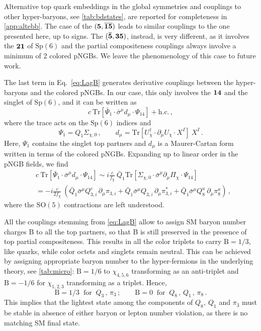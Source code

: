\documentclass[preprintnumbers,nofootinbib,showpacs,eqsecnum,pre,12pt]{revtex4-1}
\newcommand{\SO}{\text{SO}}
\newcommand{\Sp}{\text{Sp}}
\newcommand{\Tr}{\text{Tr}}
\begin{document}
Alternative top quark embeddings in the global symmetries and couplings to other hyper-baryons, see \cref{tab:bdstates}, are reported for completeness in \cref{app:altebb}. The case of the $({\bf 5}, {\bf \overline{15}})$ leads to similar couplings to the one presented here, up to signs. The $({\bf \bar 5}, {\bf 35})$, instead, is very different, as it involves the $\bf 21$ of $\Sp(6)$ and the partial compositeness couplings always involve a minimum of 2 colored pNGBs. We leave the phenomenology of this case to future work.



The last term in Eq.~\eqref{eq:LagB} generates derivative couplings between the hyper-baryons and the colored pNGBs. In our case, this only involves the $\bf 14$ and the singlet of $\Sp(6)$, and it can be written as
\begin{equation}
    c\ \mbox{Tr} \left[\bar{\Psi}_1\cdot  \bar \sigma^\mu d_\mu\cdot  \Psi_{14}\right] + \text{h.c.}\,,
\end{equation}
where the trace acts on the $\Sp(6)$ indices and
\begin{equation}
    \Psi_1 = Q_1 \Sigma_{\chi,0}\,, \qquad d_\mu = \mbox{Tr} \left[U_\chi^\dagger\cdot  \partial_\mu U_\chi\cdot  X^I \right]\ X^I\,.
\end{equation}
Here, $\Psi_1$ contains the singlet top partners and $d_\mu$ is a Maurer-Cartan form written in terms of the colored pNGBs.
Expanding up to linear order in the pNGB fields, we find
\begin{align}\label{eq:Lder141}
		& c\ \Tr \left[\bar{\Psi}_1\cdot  \bar{\sigma}^\mu d_\mu\cdot  \Psi_{14}\right] \sim i \frac{c}{f_\chi}\  \bar{Q}_1 \Tr\left[\Sigma_{\chi,0} \cdot \bar{\sigma}^\mu \partial_\mu \Pi_\chi \cdot \Psi_{14}\right] \nonumber\\
		&=-i \frac{c}{2 f_\chi}\ \left( \bar{Q}_1 \bar{\sigma}^\mu Q_{3,i}^c \, \partial_\mu \pi_{3,i} +\bar{Q}_1 \bar{\sigma}^\mu Q_{3,i} \, \partial_\mu \pi_{3,i}^* + \bar{Q}_1 \bar{\sigma}^\mu Q_8^a \ \partial_\mu \pi_8^a \right)\,,
\end{align}
where the $\SO(5)$ contractions are left understood.

All the couplings stemming from \cref{eq:LagB} allow to assign SM baryon number charges B to all the top partners, so that B is still preserved in the presence of top partial compositeness. This results in all the color triplets to carry $\text{B}=1/3$, like quarks, while color octets and singlets remain neutral. This can be achieved by assigning appropriate baryon number to the hyper-fermions in the underlying theory, see \cref{tab:micro}: $\text{B} = 1/6$ to $\chi_{4,5,6}$ transforming as an anti-triplet and $\text{B} = -1/6$ for $\chi_{1,2,3}$ transforming as a triplet. Hence,
\begin{equation}
    \text{B} = 1/3\;\; \mbox{for}\;\; Q_3\,,\, \pi_3\,; \qquad \text{B} = 0\;\; \mbox{for}\;\; Q_8\,,\, Q_1\,,\, \pi_8\,. 
\end{equation}
This implies that the lightest state among the components of $Q_8,\ Q_1$ and $\pi_3$ must be stable in absence of either baryon or lepton number violation, as there is no matching SM final state.
\end{document}
